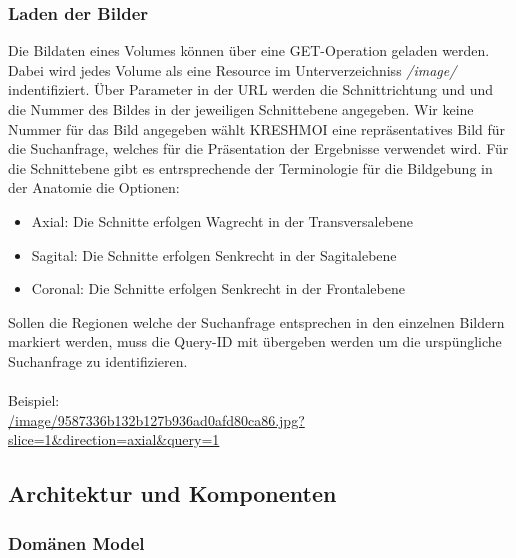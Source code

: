 \subsubsection{Laden der Bilder}
\label{sec:Laden der Bilder}
Die Bildaten eines Volumes können über eine GET-Operation geladen werden.
Dabei wird jedes Volume als eine Resource im Unterverzeichniss \textit{/image/} indentifiziert.
Über Parameter in der URL werden die Schnittrichtung und und die Nummer des Bildes in der jeweiligen Schnittebene angegeben.
Wir keine Nummer für das Bild angegeben wählt KRESHMOI eine repräsentatives Bild für die Suchanfrage, welches für die Präsentation der Ergebnisse verwendet wird.
Für die Schnittebene gibt es entrsprechende der Terminologie für die Bildgebung in der Anatomie die Optionen:
\begin{itemize}
	\item Axial: Die Schnitte erfolgen Wagrecht in der Transversalebene
	\item Sagital: Die Schnitte erfolgen Senkrecht in der Sagitalebene
	\item Coronal: Die Schnitte erfolgen Senkrecht in der Frontalebene 
\end{itemize}
Sollen die Regionen welche der Suchanfrage entsprechen in den einzelnen Bildern markiert werden, muss die Query-ID mit übergeben werden um die urspüngliche Suchanfrage zu identifizieren.
\\
\\
Beispiel:
\\
\url{/image/9587336b132b127b936ad0afd80ca86.jpg?slice=1&direction=axial&query=1}

\subsection{Architektur und Komponenten}
\label{sec:Architektur und Komponenten}

\subsubsection{Domänen Model}
\label{sec:Domänen Model}

